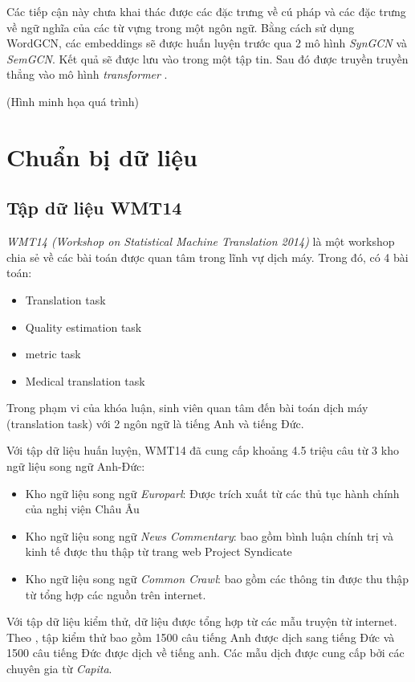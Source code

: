Các tiếp cận này chưa khai thác được các đặc trưng về cú pháp và các đặc trưng về ngữ nghĩa của các từ vựng trong một ngôn ngữ. Bằng cách sử dụng WordGCN, các embeddings sẽ được huấn luyện trước qua 2 mô hình \textit{SynGCN} và \textit{SemGCN}. Kết quả sẽ được lưu vào trong một tập tin. Sau đó được truyền truyền thẳng vào mô hình  \textit{transformer} .

(Hình minh họa quá trình)

\section{Chuẩn bị dữ liệu}

\subsection{Tập dữ liệu WMT14}
\textit{WMT14 (Workshop on Statistical Machine Translation 2014)} \cite{wmt14} là một workshop chia sẻ về các bài toán được quan tâm trong lĩnh vự dịch máy. Trong đó, có 4 bài toán:
\begin{itemize}
	\item Translation task 
	\item Quality estimation task 
	\item metric task 
	\item Medical translation task
\end{itemize}

Trong phạm vi của khóa luận, sinh viên quan tâm đến bài toán dịch máy (translation task) với 2 ngôn ngữ là tiếng Anh và tiếng Đức. 

Với tập dữ liệu huấn luyện, WMT14 đã cung cấp khoảng 4.5 triệu câu từ 3 kho ngữ liệu song ngữ Anh-Đức:
\begin{itemize}
	\item Kho ngữ liệu song ngữ \textit{Europarl}: Được trích xuất từ các thủ tục hành chính của nghị viện Châu Âu
	\item Kho ngữ liệu song ngữ \textit{News Commentary}: bao gồm bình luận chính trị và kinh tế được thu thập từ trang web Project Syndicate
	\item Kho ngữ liệu song ngữ \textit{Common Crawl}: bao gồm các thông tin được thu thập từ tổng hợp các nguồn trên internet.
\end{itemize}

Với tập dữ liệu kiểm thử, dữ liệu được tổng hợp từ các mẫu truyện từ internet. Theo \cite{wmt14}, tập kiểm thử bao gồm 1500 câu tiếng Anh được dịch sang tiếng Đức và 1500 câu tiếng Đức được dịch về tiếng anh. Các mẫu dịch được cung cấp bởi các chuyên gia từ \textit{Capita}. 

